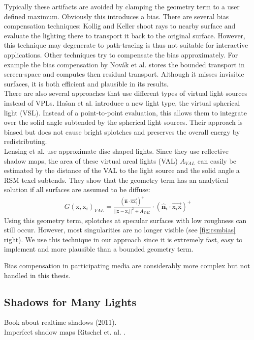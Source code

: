 \documentclass[thesis.tex]{subfiles}
\begin{document}
Typically these artifacts are avoided by clamping the geometry term to a user defined maximum.
Obviously this introduces a bias.
There are several bias compensation techniques:
Kollig and Keller \cite{bib:biascomp:kk04} shoot rays to nearby surface and evaluate the lighting there to transport it back to the original surface.
However, this technique may degenerate to path-tracing is thus not suitable for interactive applications.
Other techniques try to compensate the bias approximately.
For example the bias compensation by Nov\'{a}k et al. \cite{bib:biascomp:novak11} stores the bounded transport in screen-space and computes then residual transport.
Although it misses invisible surfaces, it is both efficient and plausible in its results. 
\\
There are also several approaches that use different types of virtual light sources instead of VPLs.
Ha{\v{s}}an et al. \cite{bib:biascomp:vsl} introduce a new light type, the virtual spherical light (VSL).
Instead of a point-to-point evaluation, this allows them to integrate over the solid angle subtended by the spherical light sources.
Their approach is biased but does not cause bright splotches and preserves the overall energy by redistributing.
\\
Lensing et al. \cite{bib:LightskinPaper} use approximate disc shaped lights.
Since they use reflective shadow maps, the area of these virtual areal lights (VAL) $A_{VAL}$ can easily be estimated by the distance of the VAL to the light source and the solid angle a RSM texel subtends.
They show that the geometry term has an analytical solution if all surfaces are assumed to be diffuse:
\begin{align}
G(\mathrm{x}, \mathrm{x}_i)_{VAL} = \frac{(\hat{\mathbf{n}} \cdot \overrightarrow{\mathrm{x}\mathrm{x}_i} )^+}{||\mathrm{x} - \mathrm{x}_i||^2 + A_{VAL}} \cdot (\hat{\mathbf{n}}_i \cdot \overrightarrow{\mathrm{x}_i\mathrm{x}})^+
\end{align}
Using this geometry term, splotches at specular surfaces with low roughness can still occur.
However, most singularities are no longer visible (see \autoref{fig:rsmbias} right).
We use this technique in our approach since it is extremely fast, easy to implement and more plausible than a bounded geometry term.

Bias compensation in participating media are considerably more complex but not handled in this thesis.

\subsection{Shadows for Many Lights}
Book about realtime shadows (2011)\cite{bib:realtimeshadowsbook}.\\
Imperfect shadow maps Ritschel et. al. \cite{bib:imperfectshadowmaps}.\\
\end{document}
